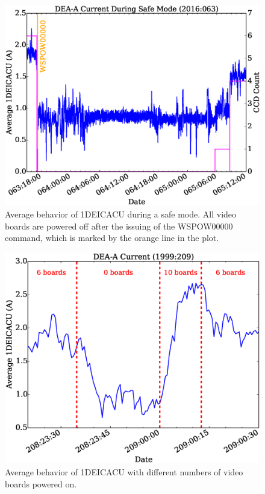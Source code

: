\documentclass[11pt]{article}
\begin{document}
\begin{landscape}
\begin{figure}
\begin{center}
\includegraphics[width=1.2\textwidth]{deaa_on_test_vid_fig2.eps}
\caption{Average behavior of 1DEICACU during a safe mode. All video boards
are powered off after the issuing of the WSPOW00000 command, which is marked by
the orange line in the plot.}
\end{center}
\end{figure}
\end{landscape}

\begin{landscape}
\begin{figure}
\begin{center}
\includegraphics[width=1.2\textwidth]{deaa_on_test_vid_fig3.eps}
\caption{Average behavior of 1DEICACU with different numbers of video boards
powered on.}
\end{center}
\end{figure}
\end{landscape}


\newcommand{\tablecaptiontext}{TURN ON DEA A AND TEST VIDEO BOARDS}

\end{document}
